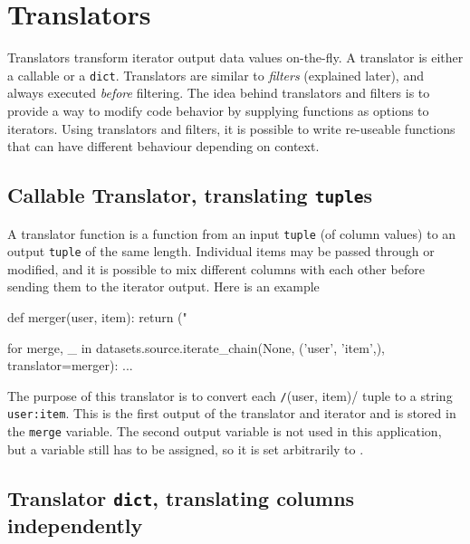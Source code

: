 \section{Translators}
\label{sec:translators}

Translators transform iterator output data values on-the-fly.  A
translator is either a callable or a \texttt{dict}.  Translators are
similar to \textsl{filters} (explained later), and always
executed \emph{before} filtering.  The idea behind translators and
filters is to provide a way to modify code behavior by supplying
functions as options to iterators.  Using translators and filters,
it is possible to write re-useable functions that can have different
behaviour depending on context.


\subsection*{Callable Translator, translating \texttt{tuple}s}

A translator function is a function from an input \texttt{tuple} (of
column values) to an output \texttt{tuple} of the same length.
Individual items may be passed through or modified, and it is possible
to mix different columns with each other before sending them to the
iterator output.  Here is an example
\begin{python}
def merger(user, item):
    return ("%

for merge, _ in datasets.source.iterate_chain(None, ('user', 'item',),
                                              translator=merger):
    ...
\end{python}
The purpose of this translator is to convert each
\texttt/(user, item)/ tuple to a string \texttt{user:item}.  This is
the first output of the translator and iterator and is stored in the
\texttt{merge} variable.  The second output variable is not used in
this application, but a variable still has to be assigned, so it is
set arbitrarily to \pyNone.



\subsection*{Translator \texttt{dict}, translating columns independently}


